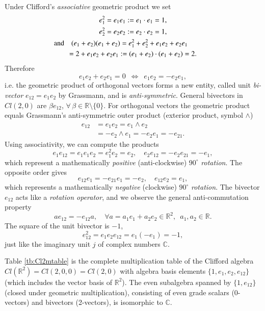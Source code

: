 \documentclass[cameraready]{jcmsi}%
\newcommand{\R}{\mathbb{R}}
\newcommand{\C}{\mathbb{C}}
\newcommand{\be}{\begin{equation}}
\newcommand{\ee}{\end{equation}}
\begin{document}
Under Clifford's \textit{associative} geometric product we set
\begin{gather}
  e_1^2=e_1e_1 := e_1\cdot e_1=1, 
  \nonumber \\ 
  e_2^2=e_2e_2 := e_2\cdot e_2=1, 
  \\
  \hspace*{-12mm}\text{and}\quad 
  (e_1+e_2)(e_1+e_2) 
  = e_1^2+e_2^2+e_1e_2 + e_2e_1 \\
  = 2 + e_1e_2 + e_2e_1
  := (e_1+e_2)\cdot(e_1+e_2) = 2.
  \nonumber 
\end{gather}
Therefore
\be 
  e_1e_2 + e_2e_1 = 0 
  \,\,\,\Leftrightarrow \,\,\,
  e_1e_2 = - e_2e_1,
\ee 
i.e. the geometric product of orthogonal vectors forms a new entity, called unit \textit{bi-vector} $e_{12}=e_1e_2$ by Grassmann, and is \textit{anti-symmetric}. General bivectors in $Cl(2,0)$ are $\beta e_{12}$, $\forall \, \beta \in \R \setminus \{0\}$. For orthogonal vectors the geometric product equals Grassmann's anti-symmetric outer product (exterior product, symbol $\wedge$) 
\begin{align} 
  e_{12} &= e_1e_2 = e_1 \wedge e_2 
  \nonumber \\
  &= - e_2 \wedge e_1 = -e_2e_1 = -e_{21}.
\end{align} 
Using associativity, we can compute the products
\be   
  e_1 e_{12} = e_1 e_1 e_2 = e_1^2 e_2 = e_2, \quad
  e_2 e_{12} = - e_2 e_{21} = - e_1,
\ee 
which represent a mathematically \textit{positive} (anti-clockwise) $90^{\circ}$ \textit{rotation}. The opposite order gives
\be 
  e_{12}e_1 = -e_{21}e_1 = -e_2, \quad e_{12}e_2 = e_1,
\ee 
which represents a mathematically \textit{negative} (clockwise) $90^{\circ}$ \textit{rotation}. The bivector $e_{12}$ acts like a \textit{rotation operator}, and we observe the general anti-commutation property
\be 
  a e_{12} = - e_{12} a, \quad \forall a=a_1e_1+a_2e_2 \in \R^2, \,\,\,a_1,a_2 \in \R.
\ee 
The square of the unit bivector is $-1$,
\be 
  e_{12}^2 = e_1 e_2 e_{12} = e_1 (-e_1) = -1,
\ee 
just like the imaginary unit $j$ of complex numbers $\C$. 

Table \ref{tb:Cl2mtable} is the complete multiplication table of the Clifford algebra $Cl(\R^2) = Cl(2,0,0) = Cl(2,0)$ with algebra basis elements $\{1, e_1, e_2, e_{12}\}$ (which includes the vector basis of $\R^2$). The even subalgebra spanned by $\{1,e_{12}\}$ (closed under geometric multiplication), consisting of even grade scalars (0-vectors) and bivectors (2-vectors), is isomorphic to $\mathbb{C}$. 
\end{document}
